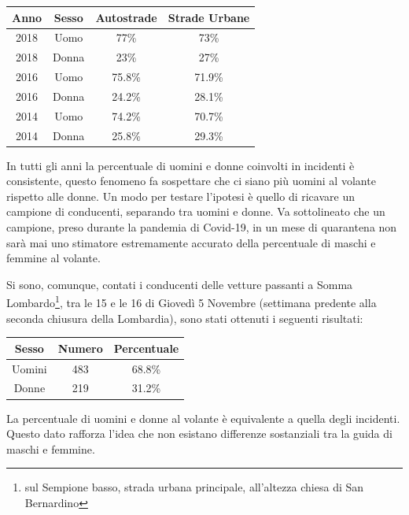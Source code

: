 \documentclass[a4paper]{report}
\begin{document}
\begin{center}
    \def\arraystretch{1.5}%
    \begin{tabular}{ |c|c|c|c| }
        \hline
        Anno & Sesso & Autostrade & Strade Urbane \\ 
        \hline
        \rowcolor{TableGray}
        2018 & Uomo & 77\%  & 73\% \\
        2018 & Donna & 23\% & 27\% \\
        \rowcolor{TableGray}
        2016 & Uomo & 75.8\%  & 71.9\% \\
        2016 & Donna & 24.2\% & 28.1\% \\
        \rowcolor{TableGray}
        2014 & Uomo & 74.2\%  & 70.7\% \\
        2014 & Donna & 25.8\% & 29.3\% \\
        \hline
    \end{tabular}
\end{center}

In tutti gli anni la percentuale di uomini e donne coinvolti in incidenti è consistente, 
questo fenomeno fa sospettare che ci siano più uomini al volante rispetto alle donne.
Un modo per testare l'ipotesi è quello di ricavare un campione di conducenti, separando tra 
uomini e donne.
Va sottolineato che un campione, preso durante la pandemia di Covid-19, in un mese di quarantena 
non sarà mai uno stimatore estremamente accurato della percentuale di maschi e femmine al volante.

Si sono, comunque, contati i conducenti delle vetture passanti a Somma 
Lombardo\footnote{sul Sempione basso, strada urbana principale, all'altezza chiesa di San Bernardino}, 
tra le 15 e le 16 di Giovedì 5 Novembre 
(settimana predente alla seconda chiusura della Lombardia), 
sono stati ottenuti i seguenti risultati:

\begin{center}
    \def\arraystretch{1.5}%
    \begin{tabular}{ |c|c|c| }
        \hline
        Sesso & Numero & Percentuale \\ 
        \hline
        \rowcolor{TableGray}
        Uomini & 483 & 68.8\% \\
        Donne & 219 & 31.2\% \\
        \hline
    \end{tabular}
\end{center}

La percentuale di uomini e donne al volante è equivalente a quella degli incidenti.
Questo dato rafforza l'idea che non esistano differenze sostanziali tra la guida di 
maschi e femmine.
\end{document}
